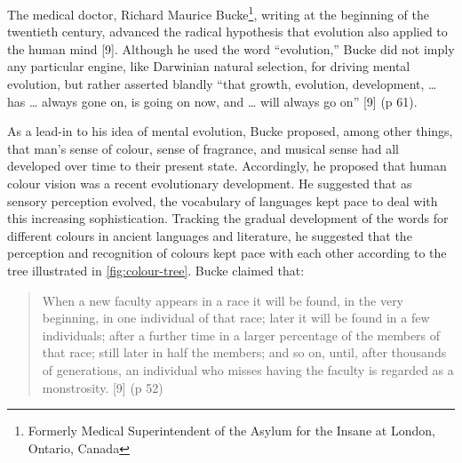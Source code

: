\documentclass[
  11pt,
  a4paper,
]{article}
\begin{document}
The medical doctor, Richard Maurice Bucke\footnote{Formerly Medical
  Superintendent of the Asylum for the Insane at London, Ontario, Canada},
writing at the beginning of the twentieth century, advanced the radical
hypothesis that evolution also applied to the human mind {[}9{]}.
Although he used the word ``evolution,'' Bucke did not imply any
particular engine, like Darwinian natural selection, for driving mental
evolution, but rather asserted blandly ``that growth, evolution,
development, \ldots{} has \ldots{} always gone on, is going on now, and
\ldots{} will always go on'' {[}9{]} (p 61).

As a lead-in to his idea of mental evolution, Bucke proposed, among
other things, that man's sense of colour, sense of fragrance, and
musical sense had all developed over time to their present state.
Accordingly, he proposed that human colour vision was a recent
evolutionary development. He suggested that as sensory perception
evolved, the vocabulary of languages kept pace to deal with this
increasing sophistication. Tracking the gradual development of the words
for different colours in ancient languages and literature, he suggested
that the perception and recognition of colours kept pace with each other
according to the tree illustrated in \cref{fig:colour-tree}. Bucke
claimed that:

\begin{quote}
When a new faculty appears in a race it will be found, in the very
beginning, in one individual of that race; later it will be found in a
few individuals; after a further time in a larger percentage of the
members of that race; still later in half the members; and so on, until,
after thousands of generations, an individual who misses having the
faculty is regarded as a monstrosity. {[}9{]} (p 52)
\end{quote}
\end{document}
